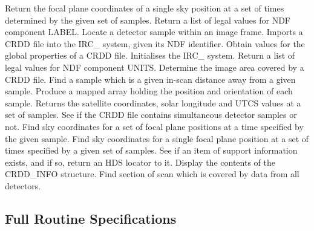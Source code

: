     {Return the focal plane coordinates of a single sky position at a set of
     times determined by the given set of samples.}
   {Return a list of legal values for NDF component LABEL.}
   {Locate a detector sample within an image frame.}
   {Imports a CRDD file into the IRC\_ system, given its NDF identifier.}
   {Obtain values for the global properties of a CRDD file. }
   {Initialises the IRC\_ system.}
   {Return a list of legal values for NDF component UNITS.}
   {Determine the image area covered by a CRDD file.}
   {Find a sample which is a given in-scan distance away from a given sample.}
   {Produce a mapped array holding the position and orientation of each sample.}
   {Returns the satellite coordinates, solar longitude and UTCS values at a
    set of samples.}
   {See if the CRDD file contains simultaneous detector samples or not.}
   {Find sky coordinates for a set of focal plane positions at a time specified
    by the given sample.}
   {Find sky coordinates for a single focal plane position at a set of times
    specified by a given set of samples.}
   {See if an item of support information exists, and if so, return an HDS
    locator to it.}
   {Display the contents of the CRDD\_INFO structure.}
   {Find section of scan which is covered by data from all detectors.}

\subsection {Full Routine Specifications}
\newlength{\sstbannerlength}
\newlength{\sstcaptionlength}

